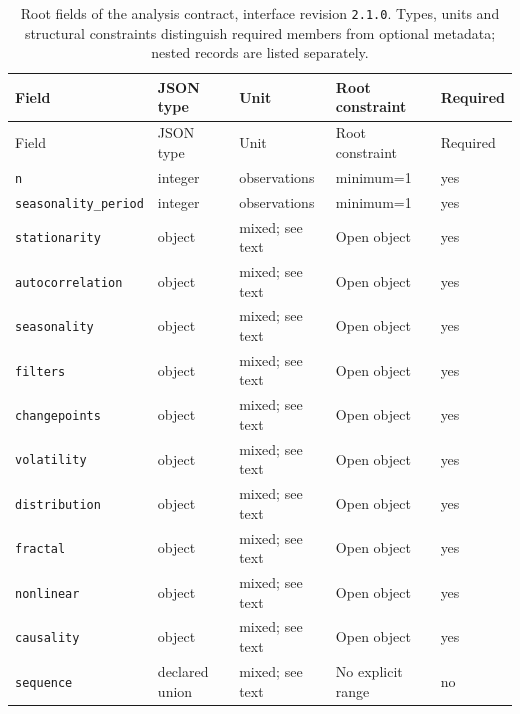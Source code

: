 \begingroup\small
\begin{longtable}{@{}p{}p{}p{}p{}p{}@{}}
\caption{Root fields of the analysis contract, interface revision \texttt{2.1.0}. Types, units and structural constraints distinguish required members from optional metadata; nested records are listed separately.}\label{tab:contract-analysis}\\
\toprule Field & JSON type & Unit & Root constraint & Required\\\midrule\endfirsthead
\toprule Field & JSON type & Unit & Root constraint & Required\\\midrule\endhead
\texttt{n} & integer & observations & minimum=1 & yes\\
\texttt{seasonality\_\allowbreak{}period} & integer & observations & minimum=1 & yes\\
\texttt{stationarity} & object & mixed; see text & Open object & yes\\
\texttt{autocorrelation} & object & mixed; see text & Open object & yes\\
\texttt{seasonality} & object & mixed; see text & Open object & yes\\
\texttt{filters} & object & mixed; see text & Open object & yes\\
\texttt{changepoints} & object & mixed; see text & Open object & yes\\
\texttt{volatility} & object & mixed; see text & Open object & yes\\
\texttt{distribution} & object & mixed; see text & Open object & yes\\
\texttt{fractal} & object & mixed; see text & Open object & yes\\
\texttt{nonlinear} & object & mixed; see text & Open object & yes\\
\texttt{causality} & object & mixed; see text & Open object & yes\\
\texttt{sequence} & declared union & mixed; see text & No explicit range & no\\
\bottomrule
\end{longtable}
\endgroup
